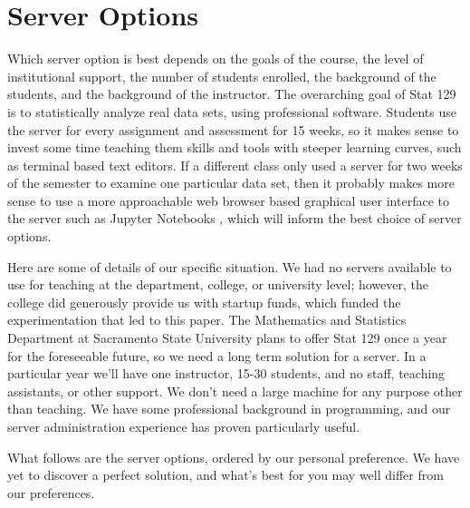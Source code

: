 \documentclass[12pt]{article}
\begin{document}
\section{Server Options}


Which server option is best depends on the goals of the course, the level of institutional support, the number of students enrolled, the background of the students, and the background of the instructor.
The overarching goal of Stat 129 is to statistically analyze real data sets, using professional software.
Students use the server for every assignment and assessment for 15 weeks, so it makes sense to invest some time teaching them skills and tools with steeper learning curves, such as terminal based text editors.
If a different class only used a server for two weeks of the semester to examine one particular data set, then it probably makes more sense to use a more approachable web browser based graphical user interface to the server such as Jupyter Notebooks \cite{kluyver2016jupyter}, which will inform the best choice of server options.

Here are some of details of our specific situation.
We had no servers available to use for teaching at the department, college, or university level; however, the college did generously provide us with startup funds, which funded the experimentation that led to this paper.
The Mathematics and Statistics Department at Sacramento State University plans to offer Stat 129 once a year for the foreseeable future, so we need a long term solution for a server.
In a particular year we'll have one instructor, 15-30 students, and no staff, teaching assistants, or other support.
We don't need a large machine for any purpose other than teaching.
We have some professional background in programming, and our server administration experience has proven particularly useful.

What follows are the server options, ordered by our personal preference.
We have yet to discover a perfect solution, and what's best for you may well differ from our preferences.



\end{document}

